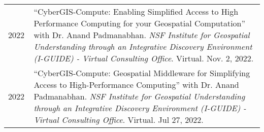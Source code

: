 \documentclass{acmcv}
\begin{document}
\vspace*{0.25cm}


    \begin{longtable}{p{0.1\linewidth} p{0.9\linewidth}}

        2022 & ``CyberGIS-Compute: Enabling Simplified Access to High Performance Computing for your Geospatial Computation'' with Dr. Anand Padmanabhan. \textit{NSF Institute for Geospatial Understanding through an Integrative Discovery Environment (I-GUIDE) - Virtual Consulting Office}. Virtual. Nov. 2, 2022.\\

        2022 & ``CyberGIS-Compute: Geospatial Middleware for Simplifying Access to High-Performance Computing'' with Dr. Anand Padmanabhan. \textit{NSF Institute for Geospatial Understanding through an Integrative Discovery Environment (I-GUIDE) - Virtual Consulting Office}. Virtual. Jul 27, 2022. \\


    \end{longtable}
    \vspace*{-0.1cm}

\end{document}
